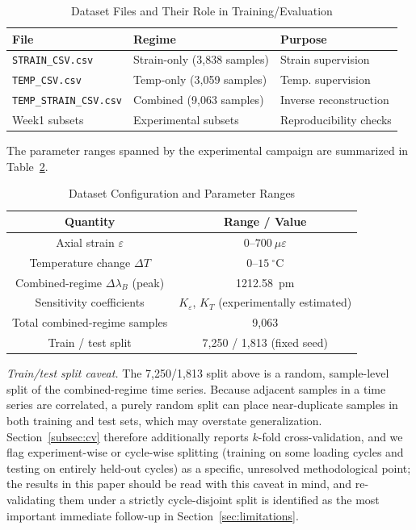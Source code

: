 \documentclass[journal,twoside,web]{ieeecolor}
\begin{document}
\begin{table}[!t]
\caption{Dataset Files and Their Role in Training/Evaluation}
\label{tab:dataset_map}
\centering
\renewcommand{\arraystretch}{1.2}
\begin{tabular}{|l|l|l|}
\hline
\textbf{File} & \textbf{Regime} & \textbf{Purpose} \\
\hline
\texttt{STRAIN\_CSV.csv} & Strain-only (3{,}838 samples) & Strain supervision \\
\texttt{TEMP\_CSV.csv} & Temp-only (3{,}059 samples) & Temp. supervision \\
\texttt{TEMP\_STRAIN\_CSV.csv} & Combined (9{,}063 samples) & Inverse reconstruction \\
Week1 subsets & Experimental subsets & Reproducibility checks \\
\hline
\end{tabular}
\end{table}

The parameter ranges spanned by the experimental campaign are summarized in
Table~\ref{tab:dataset_config}.

\begin{table}[!t]
\caption{Dataset Configuration and Parameter Ranges}
\label{tab:dataset_config}
\centering
\renewcommand{\arraystretch}{1.15}
\begin{tabular}{|c|c|}
\hline
\textbf{Quantity} & \textbf{Range / Value} \\
\hline
Axial strain $\varepsilon$ & $0$--$700~\mu\varepsilon$ \\
Temperature change $\Delta T$ & $0$--$15~^\circ$C \\
Combined-regime $\Delta \lambda_B$ (peak) & 1212.58~pm \\
Sensitivity coefficients & $K_\varepsilon$, $K_T$ (experimentally estimated) \\
Total combined-regime samples & 9{,}063 \\
Train / test split & 7{,}250 / 1{,}813 (fixed seed) \\
\hline
\end{tabular}
\end{table}

\emph{Train/test split caveat.} The 7{,}250/1{,}813 split above is a
random, sample-level split of the combined-regime time series. Because
adjacent samples in a time series are correlated, a purely random split can
place near-duplicate samples in both training and test sets, which may
overstate generalization. Section~\ref{subsec:cv} therefore additionally
reports $k$-fold cross-validation, and we flag experiment-wise or
cycle-wise splitting (training on some loading cycles and testing on
entirely held-out cycles) as a specific, unresolved methodological point;
the results in this paper should be read with this caveat in mind, and
re-validating them under a strictly cycle-disjoint split is identified as
the most important immediate follow-up in
Section~\ref{sec:limitations}.
\end{document}
